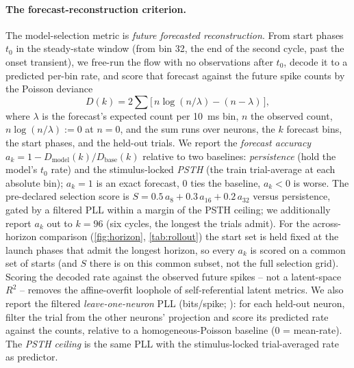 \documentclass{article}
\begin{document}
\paragraph{The forecast-reconstruction criterion.}
\label{sec:criterion}
The model-selection metric is \emph{future forecasted reconstruction}. From start phases
$t_0$ in the steady-state window (from bin \num{32}, the end of the second cycle, past the onset
transient), we free-run the flow with no observations after $t_0$, decode it to a predicted
per-bin rate, and score that forecast against the future spike counts by the Poisson deviance
\begin{equation}
  D(k)=2\textstyle\sum\big[\,n\log(n/\lambda)-(n-\lambda)\,\big],
  \label{eq:dev}
\end{equation}
where $\lambda$ is the forecast's expected count per \SI{10}{ms} bin, $n$ the observed count,
$n\log(n/\lambda)\!:=\!0$ at $n{=}0$, and the sum runs over neurons, the $k$ forecast bins, the
start phases, and the held-out trials. We report the \emph{forecast accuracy}
$a_k=1-D_{\mathrm{model}}(k)/D_{\mathrm{base}}(k)$ relative to two baselines: \emph{persistence}
(hold the model's $t_0$ rate) and the stimulus-locked \emph{PSTH} (the train trial-average at
each absolute bin); $a_k{=}1$ is an exact forecast, $0$ ties the baseline, $a_k{<}0$ is worse.
The pre-declared selection score is $S=0.5\,a_8+0.3\,a_{16}+0.2\,a_{32}$ versus persistence,
gated by a filtered PLL within a margin of the PSTH ceiling; we additionally report $a_k$ out to
$k{=}96$ (six cycles, the longest the trials admit). For the across-horizon comparison
(\cref{fig:horizon}, \cref{tab:rollout}) the start set is held fixed at the launch phases that
admit the longest horizon, so every $a_k$ is scored on a common set of starts (and $S$ there is on
this common subset, not the full selection grid). Scoring the decoded rate against the
observed future spikes -- not a latent-space $R^2$ -- removes the affine-overfit loophole of
self-referential latent metrics. We also report the filtered \emph{leave-one-neuron} PLL
(bits/spike; \cite{Zhao2016a}): for each held-out neuron, filter the trial from the other neurons'
projection and score its predicted rate against the counts, relative to a homogeneous-Poisson
baseline (0 = mean-rate). The \emph{PSTH ceiling} is the same PLL with the stimulus-locked
trial-averaged rate as predictor.
\end{document}
